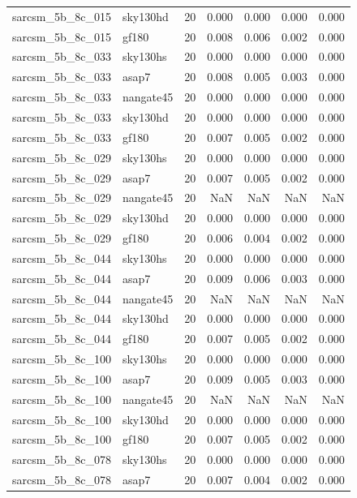 \begin{tabular}{llrrrrr}
sarcsm\_5b\_8c\_015 & sky130hd & 20 & 0.000 & 0.000 & 0.000 & 0.000 \\
sarcsm\_5b\_8c\_015 & gf180 & 20 & 0.008 & 0.006 & 0.002 & 0.000 \\
sarcsm\_5b\_8c\_033 & sky130hs & 20 & 0.000 & 0.000 & 0.000 & 0.000 \\
sarcsm\_5b\_8c\_033 & asap7 & 20 & 0.008 & 0.005 & 0.003 & 0.000 \\
sarcsm\_5b\_8c\_033 & nangate45 & 20 & 0.000 & 0.000 & 0.000 & 0.000 \\
sarcsm\_5b\_8c\_033 & sky130hd & 20 & 0.000 & 0.000 & 0.000 & 0.000 \\
sarcsm\_5b\_8c\_033 & gf180 & 20 & 0.007 & 0.005 & 0.002 & 0.000 \\
sarcsm\_5b\_8c\_029 & sky130hs & 20 & 0.000 & 0.000 & 0.000 & 0.000 \\
sarcsm\_5b\_8c\_029 & asap7 & 20 & 0.007 & 0.005 & 0.002 & 0.000 \\
sarcsm\_5b\_8c\_029 & nangate45 & 20 & NaN & NaN & NaN & NaN \\
sarcsm\_5b\_8c\_029 & sky130hd & 20 & 0.000 & 0.000 & 0.000 & 0.000 \\
sarcsm\_5b\_8c\_029 & gf180 & 20 & 0.006 & 0.004 & 0.002 & 0.000 \\
sarcsm\_5b\_8c\_044 & sky130hs & 20 & 0.000 & 0.000 & 0.000 & 0.000 \\
sarcsm\_5b\_8c\_044 & asap7 & 20 & 0.009 & 0.006 & 0.003 & 0.000 \\
sarcsm\_5b\_8c\_044 & nangate45 & 20 & NaN & NaN & NaN & NaN \\
sarcsm\_5b\_8c\_044 & sky130hd & 20 & 0.000 & 0.000 & 0.000 & 0.000 \\
sarcsm\_5b\_8c\_044 & gf180 & 20 & 0.007 & 0.005 & 0.002 & 0.000 \\
sarcsm\_5b\_8c\_100 & sky130hs & 20 & 0.000 & 0.000 & 0.000 & 0.000 \\
sarcsm\_5b\_8c\_100 & asap7 & 20 & 0.009 & 0.005 & 0.003 & 0.000 \\
sarcsm\_5b\_8c\_100 & nangate45 & 20 & NaN & NaN & NaN & NaN \\
sarcsm\_5b\_8c\_100 & sky130hd & 20 & 0.000 & 0.000 & 0.000 & 0.000 \\
sarcsm\_5b\_8c\_100 & gf180 & 20 & 0.007 & 0.005 & 0.002 & 0.000 \\
sarcsm\_5b\_8c\_078 & sky130hs & 20 & 0.000 & 0.000 & 0.000 & 0.000 \\
sarcsm\_5b\_8c\_078 & asap7 & 20 & 0.007 & 0.004 & 0.002 & 0.000 \\

\end{tabular}

